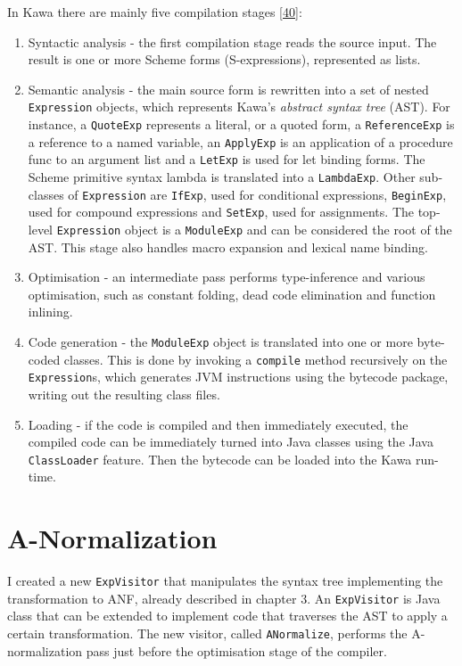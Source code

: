 \documentclass[12pt,a4paper,oneside,openright]{book}
\begin{document}
In Kawa there are mainly five compilation stages
{[}\hyperref[ref-Bothner1998]{40}{]}:

\begin{enumerate}
\def\labelenumi{\arabic{enumi}.}
\item
  Syntactic analysis - the first compilation stage reads the source
  input. The result is one or more Scheme forms (S-expressions),
  represented as lists.
\item
  Semantic analysis - the main source form is rewritten into a set of
  nested \texttt{Expression} objects, which represents Kawa's
  \emph{abstract syntax tree} (AST). For instance, a \texttt{QuoteExp}
  represents a literal, or a quoted form, a \texttt{ReferenceExp} is a
  reference to a named variable, an \texttt{ApplyExp} is an application
  of a procedure func to an argument list and a \texttt{LetExp} is used
  for let binding forms. The Scheme primitive syntax lambda is
  translated into a \texttt{LambdaExp}. Other sub-classes of
  \texttt{Expression} are \texttt{IfExp}, used for conditional
  expressions, \texttt{BeginExp}, used for compound expressions and
  \texttt{SetExp}, used for assignments. The top-level
  \texttt{Expression} object is a \texttt{ModuleExp} and can be
  considered the root of the AST. This stage also handles macro
  expansion and lexical name binding.
\item
  Optimisation - an intermediate pass performs type-inference and
  various optimisation, such as constant folding, dead code elimination
  and function inlining.
\item
  Code generation - the \texttt{ModuleExp} object is translated into one
  or more byte-coded classes. This is done by invoking a
  \texttt{compile} method recursively on the \texttt{Expression}s, which
  generates JVM instructions using the bytecode package, writing out the
  resulting class files.
\item
  Loading - if the code is compiled and then immediately executed, the
  compiled code can be immediately turned into Java classes using the
  Java \texttt{ClassLoader} feature. Then the bytecode can be loaded
  into the Kawa run-time.
\end{enumerate}

\section{A-Normalization}\label{a-normalization-1}

I created a new \texttt{ExpVisitor} that manipulates the syntax tree
implementing the transformation to ANF, already described in chapter 3.
An \texttt{ExpVisitor} is Java class that can be extended to implement
code that traverses the AST to apply a certain transformation. The new
visitor, called \texttt{ANormalize}, performs the A-normalization pass
just before the optimisation stage of the compiler.
\end{document}
